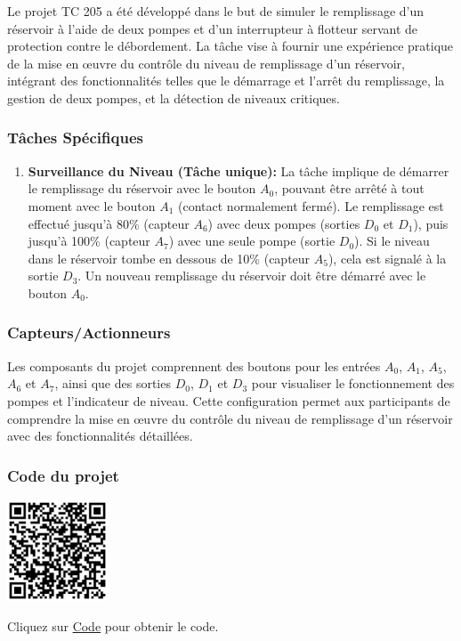 \documentclass[a4paper,12pt]{report}
\begin{document}
Le projet TC 205 a été développé dans le but de simuler le remplissage d'un réservoir à l'aide de deux pompes et d'un interrupteur à flotteur servant de protection contre le débordement. La tâche vise à fournir une expérience pratique de la mise en œuvre du contrôle du niveau de remplissage d'un réservoir, intégrant des fonctionnalités telles que le démarrage et l'arrêt du remplissage, la gestion de deux pompes, et la détection de niveaux critiques.

\subsubsection{Tâches Spécifiques}

\begin{enumerate}
    \item \textbf{Surveillance du Niveau (Tâche unique):} La tâche implique de démarrer le remplissage du réservoir avec le bouton \(A_0\), pouvant être arrêté à tout moment avec le bouton \(A_1\) (contact normalement fermé). Le remplissage est effectué jusqu'à 80\% (capteur \(A_6\)) avec deux pompes (sorties \(D_0\) et \(D_1\)), puis jusqu'à 100\% (capteur \(A_7\)) avec une seule pompe (sortie \(D_0\)). Si le niveau dans le réservoir tombe en dessous de 10\% (capteur \(A_5\)), cela est signalé à la sortie \(D_3\). Un nouveau remplissage du réservoir doit être démarré avec le bouton \(A_0\).
\end{enumerate}

\subsubsection{Capteurs/Actionneurs}

Les composants du projet comprennent des boutons pour les entrées \(A_0\), \(A_1\), \(A_5\), \(A_6\) et \(A_7\), ainsi que des sorties \(D_0\), \(D_1\) et \(D_3\) pour visualiser le fonctionnement des pompes et l'indicateur de niveau. Cette configuration permet aux participants de comprendre la mise en œuvre du contrôle du niveau de remplissage d'un réservoir avec des fonctionnalités détaillées.

\subsubsection{Code du projet}

\begin{minipage}{0.5\textwidth}
    \includegraphics[height=3cm]{Code TC205.png}
\end{minipage}%
\begin{minipage}{0.5\textwidth}
    Cliquez sur \href{https://github.com/DexterTaha/Controllino-PLC-Sample/blob/main/TC200/TC205_Surveillance_de_niveau/TC205_Surveillance_de_niveau.ino}{Code} pour obtenir le code.
\end{minipage}
\end{document}
